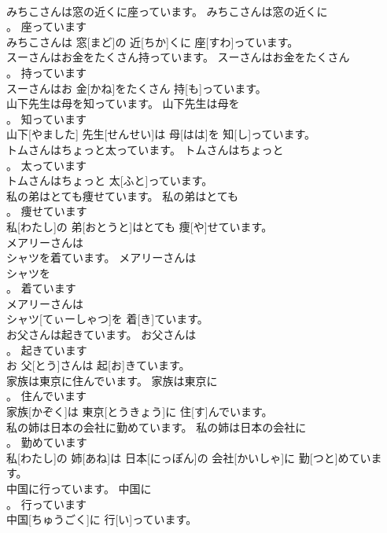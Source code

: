 \documentclass[8pt]{extreport}
\begin{document}
\begin{CJK}{UTF8}{min}
\\	みちこさんは窓の近くに座っています。	みちこさんは窓の近くに
\\	。	座っています	
\\	みちこさんは 窓[まど]の 近[ちか]くに 座[すわ]っています。	
\\	スーさんはお金をたくさん持っています。	スーさんはお金をたくさん
\\	。	持っています	
\\	スーさんはお 金[かね]をたくさん 持[も]っています。	
\\	山下先生は母を知っています。	山下先生は母を
\\	。	知っています	
\\	山下[やました] 先生[せんせい]は 母[はは]を 知[し]っています。	
\\	トムさんはちょっと太っています。	トムさんはちょっと
\\	。	太っています	
\\	トムさんはちょっと 太[ふと]っています。	
\\	私の弟はとても痩せています。	私の弟はとても
\\	。	痩せています	
\\	私[わたし]の 弟[おとうと]はとても 痩[や]せています。	
\\	メアリーさんは
\\	シャツを着ています。	メアリーさんは
\\	シャツを
\\	。	着ています	
\\	メアリーさんは 
\\	シャツ[てぃーしゃつ]を 着[き]ています。	
\\	お父さんは起きています。	お父さんは
\\	。	起きています	
\\	お 父[とう]さんは 起[お]きています。	
\\	家族は東京に住んでいます。	家族は東京に
\\	。	住んでいます	
\\	家族[かぞく]は 東京[とうきょう]に 住[す]んでいます。	
\\	私の姉は日本の会社に勤めています。	私の姉は日本の会社に
\\	。	勤めています	
\\	私[わたし]の 姉[あね]は 日本[にっぽん]の 会社[かいしゃ]に 勤[つと]めています。	
\\	中国に行っています。	中国に
\\	。	行っています	
\\	中国[ちゅうごく]に 行[い]っています。	

\end{CJK}
\end{document}
